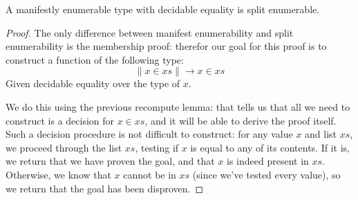 \begin{lemma} \label{manifest-enum-to-split-enum}
  A manifestly enumerable type with decidable equality is split enumerable.
\end{lemma}
\begin{proof}
  The only difference between manifest enumerability and split enumerability is
  the membership proof: therefor our goal for this proof is to construct a
  function of the following type:
  \begin{equation}
    \lVert x \in \mathit{xs} \rVert \rightarrow x \in \mathit{xs}
  \end{equation}
  Given decidable equality over the type of \(x\).

  We do this using the previous recompute lemma: that tells us that all we need
  to construct is a decision for \(x \in \mathit{xs}\), and it will be able to
  derive the proof itself.
  Such a decision procedure is not difficult to construct: for any value \(x\)
  and list \(\mathit{xs}\), we proceed through the list \(\mathit{xs}\), testing
  if \(x\) is equal to any of its contents.
  If it is, we return that we have proven the goal, and that \(x\) is indeed
  present in \(\mathit{xs}\).
  Otherwise, we know that \(x\) cannot be in \(\mathit{xs}\) (since we've tested
  every value), so we return that the goal has been disproven.
\end{proof}
